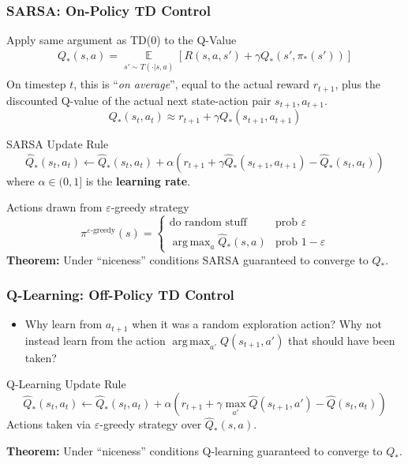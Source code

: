 \documentclass[10pt,a4paper]{beamer}
\DeclareMathOperator*{\argmax}{arg\,max}
\begin{document}
%
\begin{frame}
	\frametitle{SARSA: On-Policy TD Control}
Apply same argument as TD(0) to the Q-Value
\begin{align*}
	Q_*(s,a) = 
	\underset{\substack{s' \sim T(\cdot | s, a)}}{\mathbb{E}} \left[ R(s,a,s') + \gamma Q_*(s', \pi_*(s')) \right]
\end{align*}
\pause
On timestep $t$, this is ``\textit{on average}'', equal to the actual reward $r_{t+1}$, plus the discounted Q-value of the actual next state-action pair $s_{t+1},a_{t+1}$.
$$
Q_{*}(s_t, a_t) \approx r_{t+1} + \gamma Q_{*}(s_{t+1}, a_{t+1})
$$
\pause
\begin{block}{SARSA Update Rule}
$$
\hat{Q}_*(s_t, a_t) \leftarrow  \hat{Q}_*(s_t, a_t) + \alpha 
\left( r_{t+1} + \gamma \hat{Q}_*(s_{t+1}, a_{t+1}) - \hat{Q}_*(s_t, a_t) \right) 
$$
where $\alpha \in (0,1]$ is the \textbf{learning rate}.
\end{block}
\pause
Actions drawn from $\varepsilon$-greedy strategy 
$$
\pi^{\varepsilon\text{-greedy}}(s) = \begin{cases}
 \text{do random stuff} & \text{prob } \varepsilon \\
 \argmax_a \hat{Q}_*(s,a) & \text{prob } 1-\varepsilon 
\end{cases}
$$
\pause
\textbf{Theorem:} Under ``niceness'' conditions 
SARSA guaranteed to converge to $Q_*$. 
	
\end{frame}

%
\begin{frame}
\frametitle{Q-Learning: Off-Policy TD Control}
	\begin{itemize}
		\item Why learn from $a_{t+1}$ when it was a random exploration action? 
		Why not instead learn
		from the action $\argmax_{a'} Q(s_{t+1}, a')$ that should have been taken?
	\end{itemize}
	\pause
	
\begin{block}{Q-Learning Update Rule}
$$
\hat{Q}_*(s_t, a_t)  \leftarrow \hat{Q}_*(s_t,a_t)
+ \alpha \left( 
r_{t+1} + \gamma \max_{a'} \hat{Q}(s_{t+1}, a') - \hat{Q}(s_t, a_t)
\right)
$$
Actions taken via $\varepsilon$-greedy strategy over $\hat{Q}_*(s,a)$.
\end{block}
\pause
\textbf{Theorem:} Under ``niceness'' conditions 
Q-learning guaranteed to converge to $Q_*$. 
\end{frame}
\end{document}
